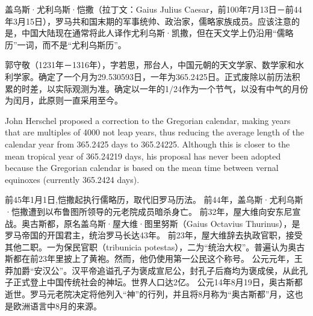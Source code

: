 盖乌斯·尤利乌斯·恺撒（拉丁文：Gaius Julius Caesar，前100年7月13日－前44年3月15日），罗马共和国末期的军事统帅、政治家，儒略家族成员。应该注意的是，中国大陆现在通常将此人译作尤利乌斯·凯撒，但在天文学上仍沿用“儒略历”一词，而不是“尤利乌斯历”。

郭守敬（1231年－1316年），字若思，邢台人，中国元朝的天文学家、数学家和水利学家。确定了一个月为29.530593日，一年为365.2425日。正式废除以前历法积累的时差，以实际观测为准。确定以一年的1/24作为一个节气，以没有中气的月份为闰月，此原则一直采用至今。

John Herschel proposed a correction to the Gregorian calendar, making years that are multiples of 4000 not leap years, thus reducing the average length of the calendar year from 365.2425 days to 365.24225. Although this is closer to the mean tropical year of 365.24219 days, his proposal has never been adopted because the Gregorian calendar is based on the mean time between vernal equinoxes (currently 365.2424 days).


前45年1月1日,恺撒起执行儒略历，取代旧罗马历法。
前44年，盖乌斯·尤利乌斯·恺撒遭到以布鲁图所领导的元老院成员暗杀身亡。
前32年，屋大维向安东尼宣战。奥古斯都，原名盖乌斯·屋大维·图里努斯（Gaius Octavius Thurinus），是罗马帝国的开国君主，统治罗马长达43年。
前23年，屋大维辞去执政官职，接受其他二职。一为保民官职（tribunicia potestas），二为“统治大权”。普遍认为奥古斯都在前23年里披上了黄袍。然而，他仍使用第一公民这个称号。
公元元年，王莽加爵“安汉公”。汉平帝追谥孔子为褒成宣尼公，封孔子后裔均为褒成侯，从此孔子正式登上中国传统社会的神坛。世界人口达2亿。
公元14年8月19日，奥古斯都逝世。罗马元老院决定将他列入“神”的行列，并且将8月称为“奥古斯都”月，这也是欧洲语言中8月的来源。














